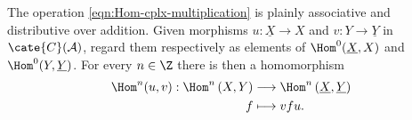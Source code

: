 The operation \eqref{eqn:Hom-cplx-multiplication} is plainly associative and
distributive over addition. Given morphisms $u:\underline{X}\to X$ and
$v:Y\to\underline{Y}$ in $\cate{C}(\mathcal{A})$, regard them respectively
as elements of $\Hom^0(\underline{X},X)$ and $\Hom^0(Y,\underline{Y})$.
For every $n\in\Z$ there is then a homomorphism
\begin{equation}\label{eqn:Hom-cplx-functoriality}\begin{aligned}
	\Hom^n(u, v): \Hom^n\left( X, Y\right) & \longrightarrow \Hom^n\left(\underline{X}, \underline{Y}\right) \\
	f & \longmapsto vfu.
\end{aligned}\end{equation}

